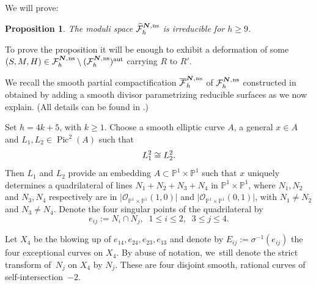 \documentclass[11pt]{article}
\newcommand{\aut}{{\mathrm{aut}}}
\newcommand{\ns}{{\mkern1mu\mathrm{ns}}}
\newcommand{\bN}{\boldsymbol{N}}
\theoremstyle{plain}
\newtheorem{prop}[thm]{Proposition}
\theoremstyle{definition}
\DeclareMathOperator{\Pic}{Pic}
\newcommand\PP{{\mathbb P}}
\newcommand\F{{\mathcal F}}
\let\x\times
\begin{document}
We will prove:

\begin{prop} \label{prop:app}
The moduli space $\widehat{\F}_h^{\bN,\ns}$ is irreducible for $h \geq 9$.
\end{prop}

To prove the proposition it will be enough to exhibit a deformation of some $(S,M,H) \in \F_h^{\bN,\ns} \setminus (\F_h^{\bN,\ns})^\aut$ carrying $R$ to $R'$.

We recall the smooth partial compactification $\overline{\F}_h^{\bN,\ns}$ of $\F_h^{\bN,\ns}$ constructed in \cite[Cor.\,5.9]{KLV1} obtained by adding a smooth divisor parametrizing reducible surfaces as we now explain. (All details can be found in \cite[\S 5]{KLV1}.)

Set $h=4k+5$, with $k \geq 1$.
Choose a smooth elliptic curve $A$, a general $x \in A$ and $L_1, L_2 \in \Pic^2(A)$ such that
\begin{equation}\label{eins}L_1^{\*2} \cong L_2^{\*2}.\end{equation} Then $L_1$ and $L_2$ provide an embedding $A\subset\PP^1 \x \PP^1$ such that $x$ uniquely determines a quadrilateral of lines $N_1+N_2+N_3+N_4$ in $\PP^1 \x \PP^1$,
where $N_1, N_2$ and $N_3 , N_4$ respectively are in $\vert \mathcal O_{\PP^1 \x \PP^1}(1,0) \vert$ and $\vert \mathcal O_{\PP^1 \x \PP^1}(0, 1) \vert$, with $N_1 \neq N_2$ and $N_3 \neq N_4$.
Denote the four singular points of the quadrilateral by
\[
 e_{ij} := N_i \cap N_j, \;\; 1 \leq i \leq 2, \;\; 3 \leq j \leq 4.
\]

\begin{center}
\end{center}

Let $X_4$
be the blowing up of $e_{14},e_{24}, e_{23}, e_{13}$ and denote by
$E_{ij} := \sigma^{-1}(e_{ij})$ the four exceptional curves on $X_4$. By abuse of notation, we~still denote the strict transform of~$N_j$ on $X_4$ by $N_j$.
These are four disjoint smooth, rational curves of self-intersection~$-2$.
\end{document}
